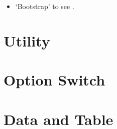 \begin{itemize}
	\item `Bootstrap' to see .
\end{itemize}

\section{Utility}

\section{Option Switch}








\section{Data and Table}


